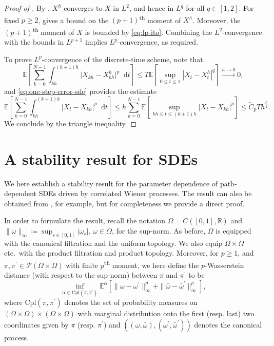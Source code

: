\documentclass[oneside]{amsart}
\theoremstyle{definition}
\newcommand{\R}{\mathbb R}
\newcommand{\Pc}{\mathcal P}
\newcommand{\cpl}{\mathrm{Cpl}}
\newcommand{\D}{\mathop{}\!\mathrm{d}}
\def\E{{\mathbb E}}
\def\R{{\mathbb R}}
\numberwithin{equation}{section}
\begin{document}
\begin{proof}[Proof of ]
	By , $X^h$ converges to $X$ in $L^2$, and hence in $L^q$ for all $q \in [1, 2]$. For fixed $p \geq 2$,  gives a bound on the $(p+1)$\textsuperscript{th} moment of $X^h$. Moreover, the $(p+1)$\textsuperscript{th} moment of $X$ is bounded by \eqref{eq:lp-ito}. Combining the $L^2$-convergence with the bounds in $L^{p+1}$ implies $L^p$-convergence, as required.

To prove $L^p$-convergence of the discrete-time scheme, note that
\begin{equation}
	\E \!\left[\sum_{k = 0}^{N - 1} \int_{kh}^{(k+1)h}\lvert X_{kh} - X^h_{kh} \rvert^p \D t\right] \leq T \E \!\left[\sup_{0 \leq t \leq 1}|X_t - X^h_t|^q\right] \xrightarrow{h \to 0} 0,
\end{equation}
and \eqref{eq:one-step-error-sde} provides the estimate
\begin{equation}
	\E \!\left[\sum_{k = 0}^{N - 1} \int_{kh}^{(k+1)h}\lvert X_t - X_{kh} \rvert^p \D t\right] \leq h\sum_{k = 0}^{N - 1}\E \!\left[\sup_{kh \leq t \leq (k + 1)h}|X_t - X_{kh}|^p\right] \leq \tilde C_p T h^{\frac p2}.
\end{equation}
We conclude by the triangle inequality.
\end{proof}

	
\section{A stability result for SDEs}

We here establish a stability result for the parameter dependence of path-dependent SDEs driven by correlated Wiener processes. The result can also be obtained from \cite[Theorem~3.24]{JaMe81}, for example, but for completeness we provide a direct proof.

In order to formulate the result, recall the notation $\Omega=C([0,1],\R)$ and $\|\omega\|_\infty \coloneqq  \sup_{s\in[0,1]}|\omega_s|$, $\omega\in \Omega$, for the sup-norm. As before, $\Omega$ is equipped with the canonical filtration and the uniform topology. 
We also equip $\Omega \times \Omega$ etc.\ with the product filtration and product topology. Moreover, for $p \geq 1$, and $\pi,\pi^\prime\in \Pc(\Omega \times \Omega)$ with finite $p$\textsuperscript{th} moment, we here define the $p$-Wasserstein distance (with respect to the sup-norm) between $\pi$ and $\pi^\prime$ to be 
\begin{equation}\label{eq:wass-stab}
	\inf_{\alpha\in \cpl(\pi,\pi^\prime)}\E^\alpha \!\left[\|\omega - \omega^\prime\|_\infty^p + \|\bar\omega - \bar \omega^\prime\|_\infty^p\right],
\end{equation}
where $\cpl(\pi,\pi^\prime)$ denotes the set of probability measures on $(\Omega \times \Omega)\times( \Omega \times \Omega)$ with marginal distribution onto the first (resp. last) two coordinates given by $\pi$ (resp. $\pi^\prime$) and $((\omega,\bar\omega),(\omega^\prime,\bar\omega^\prime))$ denotes the canonical process.
\end{document}
